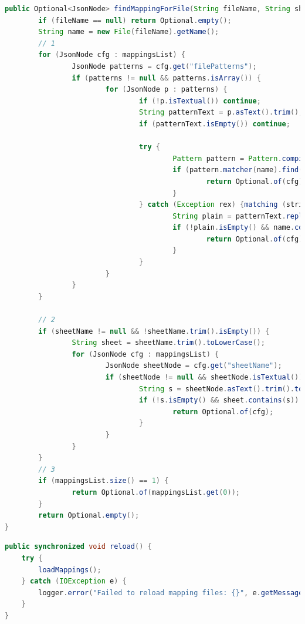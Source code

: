 \begin{lstlisting}[language=Java, frame=single, caption=Файлын нэрээр mapping автоматаар сонгох]
public Optional<JsonNode> findMappingForFile(String fileName, String sheetName) {
		if (fileName == null) return Optional.empty();
		String name = new File(fileName).getName();
		// 1
		for (JsonNode cfg : mappingsList) {
				JsonNode patterns = cfg.get("filePatterns");
				if (patterns != null && patterns.isArray()) {
						for (JsonNode p : patterns) {
								if (!p.isTextual()) continue;
								String patternText = p.asText().trim();
								if (patternText.isEmpty()) continue;

								try {
										Pattern pattern = Pattern.compile(patternText);
										if (pattern.matcher(name).find()) {
												return Optional.of(cfg);
										}
								} catch (Exception rex) {matching (strip .* common pattern)
										String plain = patternText.replace(".*", "");
										if (!plain.isEmpty() && name.contains(plain)) {
												return Optional.of(cfg);
										}
								}
						}
				}
		}

		// 2
		if (sheetName != null && !sheetName.trim().isEmpty()) {
				String sheet = sheetName.trim().toLowerCase();
				for (JsonNode cfg : mappingsList) {
						JsonNode sheetNode = cfg.get("sheetName");
						if (sheetNode != null && sheetNode.isTextual()) {
								String s = sheetNode.asText().trim().toLowerCase();
								if (!s.isEmpty() && sheet.contains(s)) {
										return Optional.of(cfg);
								}
						}
				}
		}
		// 3
		if (mappingsList.size() == 1) {
				return Optional.of(mappingsList.get(0));
		}
		return Optional.empty();
}
\end{lstlisting}

\begin{lstlisting}[language=Java, frame=single, caption=Runtime reload хийх capability]
public synchronized void reload() {
	try {
		loadMappings();
	} catch (IOException e) {
		logger.error("Failed to reload mapping files: {}", e.getMessage(), e);
	}
}
\end{lstlisting}
